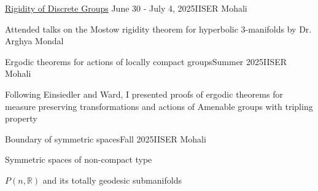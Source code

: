 \documentclass{LoLaTeXcv}
\begin{document}
\begin{lltxJob}{
	\href{https://docs.google.com/document/d/18rjLGn7hJHEmRk-QYcSysw5hH7nbYy5A}{Rigidity of Discrete Groups}
	}{June 30 - July 4, 2025}{IISER Mohali}
	\item Attended talks on the Mostow rigidity theorem for hyperbolic 3-manifolds by Dr. Arghya Mondal
\end{lltxJob}

\begin{lltxJob}{Ergodic theorems for actions of locally compact groups}{Summer 2025}{IISER Mohali}
	\item Following Einsiedler and Ward, I presented proofs of ergodic theorems for measure preserving transformations and actions of Amenable groups with tripling property
\end{lltxJob}


\begin{lltxJob}{Boundary of symmetric spaces}{Fall 2025}{IISER Mohali}
	\item Symmetric spaces of non-compact type
	\item $P(n,\mathbb{R})$ and its totally geodesic submanifolds
\end{lltxJob}







\end{document}
